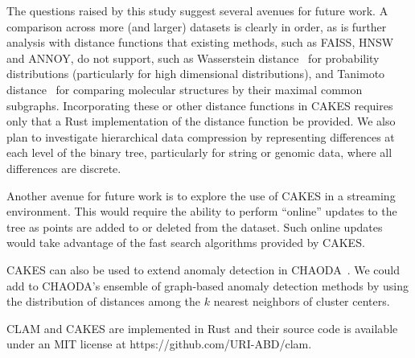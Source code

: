 The questions raised by this study suggest several avenues for future work.
A comparison across more (and larger) datasets is clearly in order, as is further analysis with distance functions that existing methods, such as FAISS, HNSW and ANNOY, do not support, such as Wasserstein distance~\cite{vallender1974calculation} for probability distributions (particularly for high dimensional distributions), and Tanimoto distance~\cite{bajusz2015tanimoto} for comparing molecular structures by their maximal common subgraphs.
Incorporating these or other distance functions in CAKES requires only that a Rust implementation of the distance function be provided.
We also plan to investigate hierarchical data compression by representing differences at each level of the binary tree, particularly for string or genomic data, where all differences are discrete.



Another avenue for future work is to explore the use of CAKES in a streaming environment.
This would require the ability to perform ``online'' updates to the tree as points are added to or deleted from the dataset.
Such online updates would take advantage of the fast search algorithms provided by CAKES.  %

CAKES can also be used to extend anomaly detection in CHAODA~\cite{ishaq2021clustered}.
We could add to CHAODA's ensemble of graph-based anomaly detection methods by using the distribution of distances among the $k$ nearest neighbors of cluster centers.

CLAM and CAKES are implemented in Rust and their source code is available under an MIT license at https://github.com/URI-ABD/clam.
